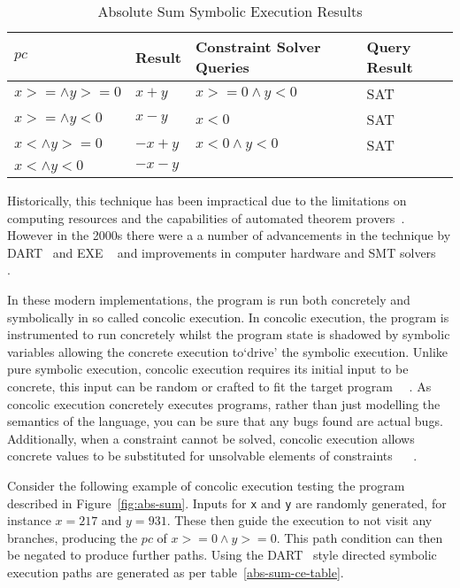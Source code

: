 \documentclass[]{final_report}
\begin{document}
\begin{table}[]
\centering
\begin{tabular}{|l|l|l|l|}
\hline
$pc$                & Result  & Constraint Solver Queries & Query Result \\ \hline
$x >= \land y >= 0$ & $x+y$   & $x >=0 \land y < 0 $      & SAT          \\ \hline
$x >= \land y < 0$  & $x - y$ & $x <0 $                   & SAT          \\ \hline
$x < \land y >= 0$  & $-x+y$  & $x<0 \land y < 0 $        & SAT          \\ \hline
$x < \land y < 0$   & $-x-y$  &                           &              \\ \hline
\end{tabular}
\caption{Absolute Sum Symbolic Execution Results}
\label{abs-sum-se-table}
\end{table}

Historically, this technique has been impractical due to the limitations on computing resources and the capabilities of automated theorem provers~\cite{king1976symbolic}. However in the 2000s there were a a number of advancements in the technique by DART~\cite{godefroid2005dart} and EXE ~\cite{cadar2008exe} and improvements in computer hardware and SMT solvers ~\cite{de2011satisfiability} .

In these modern implementations, the program is run both concretely and symbolically in so called concolic execution. In concolic execution, the program is instrumented to run concretely whilst the program state is shadowed by symbolic variables allowing the concrete execution to`drive' the symbolic execution. Unlike pure symbolic execution, concolic execution requires its initial input to be concrete, this input can be random or crafted to fit the target program~\cite{godefroid2008grammar} ~\cite{cadar2013symbolic}. As concolic execution concretely executes programs, rather than just modelling the semantics of the language, you can be sure that any bugs found are actual bugs. Additionally, when a constraint cannot be solved, concolic execution allows concrete values to be substituted for unsolvable elements of constraints ~\cite{sen2007concolic} ~\cite{sen2005cute}.

Consider the following example of concolic execution testing the program described in  Figure~\ref{fig:abs-sum}. Inputs for \lstinline {x} and \lstinline {y} are randomly generated, for instance $x=217$ and $y=931$. These then guide the execution to not visit any branches, producing the $pc$ of $x >= 0 \land y >=0$. This path condition can then be negated to produce further paths. Using the DART~\cite{godefroid2005dart} style directed symbolic execution paths are generated as per table~\ref{abs-sum-ce-table}.
\end{document}
